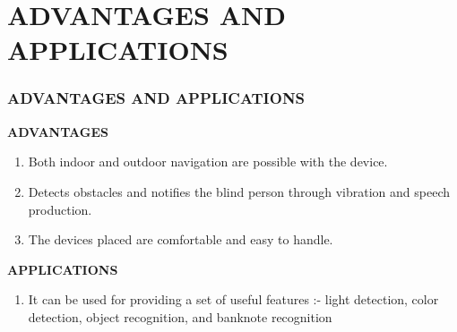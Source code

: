\documentclass[
	11pt, %
	t, %
	aspectratio=169, %
]{beamer}
\begin{document}
\section{ADVANTAGES AND APPLICATIONS}
\begin{frame}
	\frametitle{ADVANTAGES AND APPLICATIONS}
	\textbf{ADVANTAGES}
	\begin{enumerate}
	\item Both indoor and outdoor navigation are possible with the device.
	\item Detects obstacles and notifies the blind person through vibration and speech production.
	\item The devices placed are comfortable and easy to handle. 
	\end{enumerate}
 \vspace{1.5cm}
	\textbf{APPLICATIONS}
	\begin{enumerate}
	\item It can be used for providing a set of useful features :- light detection, color detection, object recognition, and banknote recognition
	\end{enumerate}
\end{frame}

\end{document}
